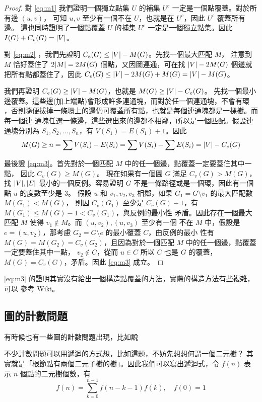 \documentclass[a4paper,12pt]{book}
\begin{document}
\begin{proof}
  對 \eqref{eq:m1} 我們證明一個獨立點集 $U$ 的補集 $U^c$ 一定是一個點覆蓋。對於所有邊 $(u, v)$，
  可知 $u, v$ 至少有一個不在 $U$，也就是在 $U^c$，因此 $U^c$ 覆蓋所有邊。
  這也同時證明了一個點覆蓋 $U$ 的補集 $U^c$ 一定是一個獨立點集。因此 $I(G) + C_v(G) = \lvert V \rvert$。

  對 \eqref{eq:m2} ，我們先證明 $C_e(G) \leq \lvert V \rvert - M(G)$。先找一個最大匹配 $M$，
  注意到 $M$ 恰好蓋住了 $2\lvert M \rvert = 2 M(G)$ 個點，又因圖連通，可在找 $\lvert V \rvert - 2 M(G)$
  個邊就把所有點都蓋住了，因此 $C_e(G) \leq \lvert V \rvert - 2 M(G) + M(G) = \lvert V \rvert - M(G)$。

  我們再證明 $C_e(G) \geq \lvert V \rvert - M(G)$，也就是 $M(G) \geq \lvert V \rvert - C_e(G)$。
  先找一個最小邊覆蓋。這些邊(加上端點)會形成許多連通塊，而對於任一個連通塊，不會有環
  ，否則隨便拔掉一條環上的邊仍可覆蓋所有點，也就是每個連通塊都是一棵樹。而每一個連
  通塊任選一條邊，這些選出來的邊都不相鄰，所以是一個匹配。假設連通塊分別為
  $S_1, S_2, \dots, S_n$，有 $V(S_1) = E(S_1) + 1$。因此
  \[ M(G) \geq n = \sum V(S_i) - E(S_i) = \sum V(S_i) - \sum E(S_i) = \lvert V \rvert - C_e(G) \]
  
  最後證 \eqref{eq:m3}。首先對於一個匹配 $M$ 中的任一個邊，點覆蓋一定要蓋住其中一點，
  因此 $C_v(G) \geq M(G)$。 現在如果有一個圖 $G$ 滿足 $C_v(G) > M(G)$，找 $\lvert V \rvert, \lvert E \rvert$
  最小的一個反例。容易證明 $G$ 不是一條路徑或是一個環，因此有一個點 $u$ 的度數至少是 $3$。
  假設 $u$ 和 $v_1, v_2, v_3$ 相鄰，如果 $G_1 = G \setminus v_1$ 的最大匹配數 $M(G_1) < M(G)$，
  則因 $C_v(G_1)$ 至少是 $C_v(G) - 1$，有 $M(G_1) \leq M(G) - 1 < C_v(G_1)$，與反例的最小性
  矛盾。因此存在一個最大匹配 $M$ 使得 $v_1 \notin M$。而 $(u, v_2), (u, v_3)$ 至少有一個
  不在 $M$ 中，假設是 $e = (u, v_2)$，那考慮 $G_2 = G \setminus e$ 的最小覆蓋 $C$，由反例的最小
  性有 $M(G) = M(G_2) = C_v(G_2)$，且因為對於一個匹配 $M$ 中的任一個邊，點覆蓋一定要蓋住其中一點，
  $v_2 \notin C$，從而 $u \in C$ 所以 $C$ 也是 $G$ 的覆蓋，$M(G) = C_v(G)$，矛盾。因此
  \eqref{eq:m3} 成立。
\end{proof}

\eqref{eq:m3} 的證明其實沒有給出一個構造點覆蓋的方法，實際的構造方法有些複雜，可以
參考 Wiki。

\subsection{圖的計數問題}
有時候也有一些圖的計數問題出現，比如說

不少計數問題可以用遞迴的方式想，比如這題，不妨先想想何謂一個二元樹？
其實就是「根節點有兩個二元子樹的樹」。因此我們可以寫出遞迴式，令
$f(n)$ 表示 $n$ 個點的二元樹個數，有
\[ f(n) = \sum_{k = 0}^{n-1} f(n-k-1) f(k) , \quad f(0) = 1\] 
\end{document}
